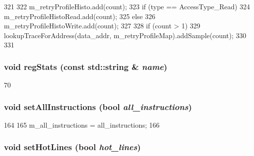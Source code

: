 \begin{DoxyCode}
321 {
322     m_retryProfileHisto.add(count);
323     if (type == AccessType_Read) {
324         m_retryProfileHistoRead.add(count);
325     } else {
326         m_retryProfileHistoWrite.add(count);
327     }
328     if (count > 1) {
329         lookupTraceForAddress(data_addr, m_retryProfileMap).addSample(count);
330     }
331 }
\end{DoxyCode}
\hypertarget{classAddressProfiler_a3dd3443357312bcb75580eaa508c48a4}{
\subsubsection[{regStats}]{\setlength{\rightskip}{0pt plus 5cm}void regStats (const std::string \& {\em name})}}
\label{classAddressProfiler_a3dd3443357312bcb75580eaa508c48a4}



\begin{DoxyCode}
70 {}
\end{DoxyCode}
\hypertarget{classAddressProfiler_a49ffa3641d3d22f47166dd03dcc39589}{
\subsubsection[{setAllInstructions}]{\setlength{\rightskip}{0pt plus 5cm}void setAllInstructions (bool {\em all\_\-instructions})}}
\label{classAddressProfiler_a49ffa3641d3d22f47166dd03dcc39589}



\begin{DoxyCode}
164 {
165     m_all_instructions = all_instructions;
166 }
\end{DoxyCode}
\hypertarget{classAddressProfiler_a7ec524009c6db09ba82f2ffc4cfff1ea}{
\subsubsection[{setHotLines}]{\setlength{\rightskip}{0pt plus 5cm}void setHotLines (bool {\em hot\_\-lines})}}
\label{classAddressProfiler_a7ec524009c6db09ba82f2ffc4cfff1ea}




